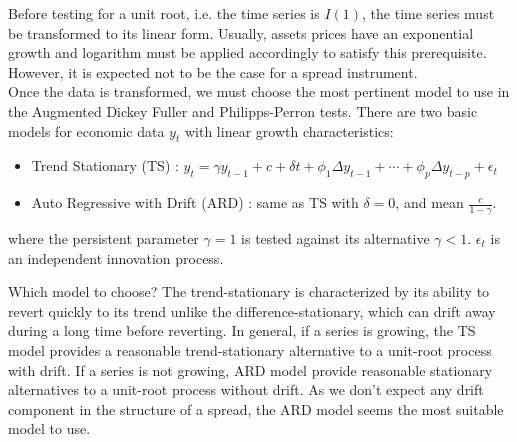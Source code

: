 \documentclass[11pt,a4,twosided,singlespacing,titlepagenumber=on]{scrreprt}
\numberwithin{equation}{chapter} %
\theoremstyle{remark}
\begin{document}
Before testing for a unit root, i.e. the time series is $I(1)$, the time series must be transformed to its linear form. Usually, assets prices have an exponential growth and logarithm must be applied accordingly to satisfy this prerequisite. However, it is expected not to be the case for a spread instrument. \\
Once the data is transformed, we must choose the most pertinent model to use in the Augmented Dickey Fuller and Philipps-Perron tests. There are two basic models for economic data $y_t$ with linear growth characteristics: 
\begin{itemize}
\item Trend Stationary (TS) : $y_t = \gamma y_{t-1} + c + \delta t + \phi_1 \Delta y_{t-1} + \cdots + \phi_p \Delta y_{t-p} + \epsilon_t $
\item Auto Regressive with Drift (ARD) : same as TS with $\delta = 0$, and mean $\frac{c}{1-\gamma}$.
\end{itemize}
where the persistent parameter $\gamma = 1$ is tested against its alternative $\gamma < 1$. $\epsilon_t$ is an independent innovation process.

Which model to choose? The trend-stationary is characterized by its ability to revert quickly to its trend unlike the difference-stationary, which can
drift away during a long time before reverting. In general, if a series is growing, the TS model provides a reasonable trend-stationary alternative to a unit-root process with drift. If a series is not growing, ARD model provide reasonable stationary alternatives to a unit-root process without drift. As we don't expect any drift component in the structure of a spread, the ARD model seems the most suitable model to use. \\
\end{document}
